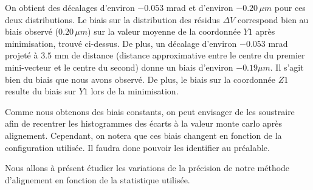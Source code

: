   \medskip
  
  On obtient des d\'ecalages d'environ $-0.053$ mrad et d'environ $-0.20 \, \mu m$ pour ces deux distributions. Le biais sur la distribution des r\'esidus $\Delta V$ correspond bien au biais observ\'e ($0.20 \, \mu m$) sur la valeur moyenne de la coordonn\'ee $Y1$ apr\`es minimisation, trouv\'e ci-dessus. De plus, un d\'ecalage d'environ $-0.053$ mrad projet\'e \`a $3.5$ mm de distance (distance approximative entre le centre du premier mini-vecteur et le centre du second) donne un biais d'environ $-0.19 \mu m$. Il s'agit bien du biais que nous avons observ\'e. De plus, le biais sur la coordonn\'ee $Z1$ resulte du biais sur $Y1$ lors de la minimisation.

  \medskip
  
  Comme nous obtenons des biais constants, on peut envisager de les soustraire afin de recentrer les histogrammes des \'ecarts \`a la valeur monte carlo apr\`es alignement. Cependant, on notera que ces biais changent en fonction de la configuration utilis\'ee. Il faudra donc pouvoir les identifier au pr\'ealable.
  
  \medskip
  
  Nous allons \`a pr\'esent \'etudier les variations de la pr\'ecision de notre m\'ethode d'alignement en fonction de la statistique utilis\'ee.
  
  \FloatBarrier
  
  
  
